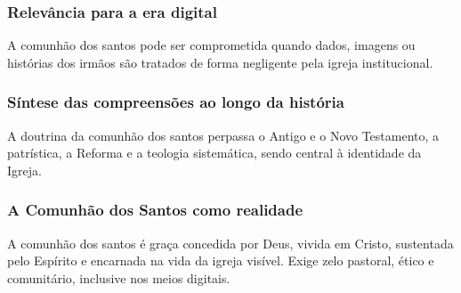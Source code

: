 \subsubsection{Relevância para a era digital}
A comunhão dos santos pode ser comprometida quando dados, imagens ou histórias dos irmãos são tratados de forma negligente pela igreja institucional.

\subsubsection{Síntese das compreensões ao longo da história}
A doutrina da comunhão dos santos perpassa o Antigo e o Novo Testamento, a patrística, a Reforma e a teologia sistemática, sendo central à identidade da Igreja.

\subsubsection{A Comunhão dos Santos como realidade}
A comunhão dos santos é graça concedida por Deus, vivida em Cristo, sustentada pelo Espírito e encarnada na vida da igreja visível. Exige zelo pastoral, ético e comunitário, inclusive nos meios digitais.
